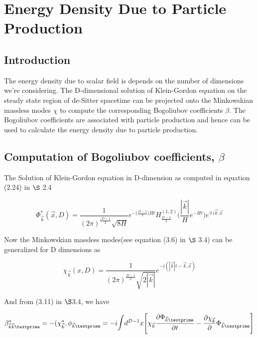 \chapter{Energy Density Due to Particle Production }

\section{Introduction}

The energy density due to  scalar field is depends on the number of dimensions we're considering. The D-dimensional solution of Klein-Gordon equation on the steady state region of de-Sitter spacetime can be projected onto the Minkowskian massless modes $\chi$ to compute the corresponding Bogoliubov coefficients $\beta$. The Bogoliubov coefficients are associated with particle production and hence can be used to calculate the energy density due to particle production.


\section{Computation of Bogoliubov coefficients, $\beta$}

The Solution of Klein-Gordon equation in D-dimension as computed in equation (2.24) in $\S$ 2.4

\begin{equation*}
\Phi_{\vec{k}}^{*}(\vec{x},D) = \frac{1}{(2\pi)^{\frac{(D-1}{2}} \sqrt{8H}}e^{-\big(\frac{D-1}{2}\big)Ht}H^{(1,2)}_{\frac{D-1}{2}}\bigg(\frac{|\vec{k}|}{H}e^{-Ht}\bigg)e^{\mp i\vec{k}.\vec{x}}
\end{equation*}

Now the Minkowskian massless modes(see equation (3.6) in  $\S$ 3.4) can be generalized for D dimensions as 

\begin{equation*}
\chi_{\vec{k}} (x,D) = \frac{1}{(2\pi)^{\frac{D-1}{2}} \sqrt{2|\vec{k}|}}e^{-i(|\vec{k}|t - \vec{k}.\vec{x})}
\end{equation*}

And from (3.11) in $\S $3.4, we have 

\begin{equation}
\beta^*_{\vec{k}\vec{k}\textprime} = - (\chi^*_{\vec{k}}, \phi_{\vec{k}\textprime}=-i \mathlarger{\mathlarger{\int}} d^{D-1}x\Bigg[\chi_{\vec{k}}\frac{\partial \Phi_{\vec{k}\textprime}}{\partial t} - \frac{\partial \chi_{\vec{k}}}{\partial}\Phi_{\vec{k}\textprime}\Bigg] 
\end{equation}

